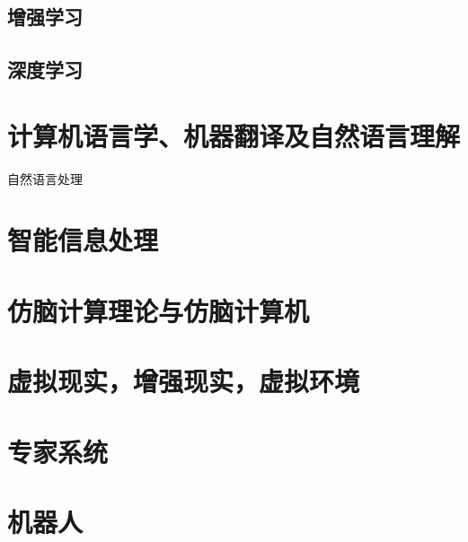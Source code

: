 \documentclass[UTF8]{../computerUniverse}
\begin{document}
\section{增强学习}
\section{深度学习}



\chapter{计算机语言学、机器翻译及自然语言理解}
自然语言处理

\chapter{智能信息处理}
\chapter{仿脑计算理论与仿脑计算机}
\chapter{虚拟现实，增强现实，虚拟环境}

\chapter{专家系统}
\chapter{机器人}
\end{document}
